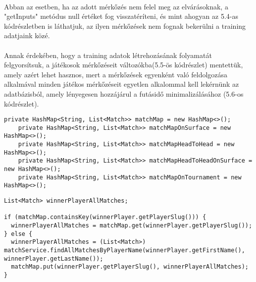 \paragraph{}
Abban az esetben, ha az adott mérkőzés nem felel meg az elvárásoknak, a "getInputs" metódus null értéket fog visszatéríteni, és mint ahogyan az 5.4-as kódrészletben is láthatjuk, az ilyen mérkőzések nem fognak bekerülni a training adatjaink közé.

\paragraph{}
Annak érdekében, hogy a training adatok létrehozásának folyamatát felgyorsítsuk, a játékosok mérkőzéseit változókba(5.5-ös kódrészlet) mentettük, amely azért lehet hasznos, mert a mérkőzések egyenként való feldolgozása alkalmával minden játékos mérkőzéseit egyetlen alkalommal kell lekérnünk az adatbázisból, amely lényegesen hozzájárul a futásidő minimalizálásához (5.6-os kódrészlet).

\begin{lstlisting}[caption=A futásidő minimalizálásához használt HashMap-ek listája]
    private HashMap<String, List<Match>> matchMap = new HashMap<>();
    private HashMap<String, List<Match>> matchMapOnSurface = new HashMap<>();
    private HashMap<String, List<Match>> matchMapHeadToHead = new HashMap<>();
    private HashMap<String, List<Match>> matchMapHeadToHeadOnSurface = new HashMap<>();
    private HashMap<String, List<Match>> matchMapOnTournament = new HashMap<>();
\end{lstlisting}

\begin{lstlisting}[caption=A győztes játékos meccseinek inicializálása]
List<Match> winnerPlayerAllMatches;

if (matchMap.containsKey(winnerPlayer.getPlayerSlug())) {
  winnerPlayerAllMatches = matchMap.get(winnerPlayer.getPlayerSlug());
} else {
  winnerPlayerAllMatches = (List<Match>) matchService.findAllMatchesByPlayerName(winnerPlayer.getFirstName(), winnerPlayer.getLastName());
  matchMap.put(winnerPlayer.getPlayerSlug(), winnerPlayerAllMatches);
}
\end{lstlisting}

